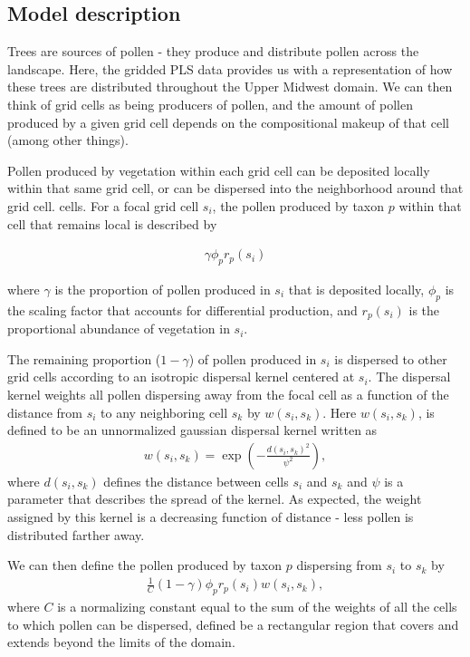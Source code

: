 \documentclass[12pt]{article}
\begin{document}
\subsection{Model description}

Trees are sources of pollen - they produce and distribute pollen
across the landscape. Here, the gridded PLS data provides us with a
representation of how these trees are distributed throughout the Upper
Midwest domain. We can then think of grid cells as being producers of
pollen, and the amount of pollen produced by a given grid cell
depends on the compositional makeup of that cell (among other things). 

Pollen produced by vegetation within each grid cell can be deposited
locally within that same grid cell, or can be dispersed into the neighborhood around that grid cell.
cells. For a focal grid cell $s_i$, the pollen produced by taxon
$p$ within that cell that remains local is described by

\begin{align}
\gamma \phi_p r_p(s_i)
\end{align} 

where $\gamma$ is the proportion of pollen produced in $s_i$ that is deposited locally,
$\phi_p$ is the scaling factor that accounts for differential
production, and $r_p(s_i)$ is the proportional abundance of vegetation
in $s_i$.

The remaining proportion ($1-\gamma$) of pollen produced in $s_i$ is
dispersed to other grid cells according to an isotropic dispersal
kernel centered at $s_i$. The dispersal kernel weights all pollen
dispersing away from the focal cell as a function of the distance from
$s_i$ to any neighboring cell $s_k$ by $w(s_i, s_k)$. Here $w(s_i,
s_k)$, is defined to be an unnormalized gaussian dispersal kernel written as
\begin{align}
w(s_i, s_k) = \exp\left( - \frac{d(s_i, s_k)^2}{\psi^2} \right),
\end{align}
where $d(s_i,s_k)$ defines the distance between cells $s_i$ and $s_k$
and $\psi$ is a parameter that describes the spread of the kernel. As
expected, the weight assigned by this kernel is a decreasing function
of distance - less pollen is distributed farther away.

 
We can then define the pollen produced by taxon $p$ dispersing from
$s_i$ to $s_k$ by
\begin{align}
\frac{1}{C} (1-\gamma) \phi_p r_p(s_i) w(s_i, s_k),
\end{align}
where $C$ is a normalizing constant equal to the sum of the weights of
all the cells to which pollen can be dispersed, defined be a
rectangular region that covers and extends beyond the limits of the domain.
\end{document}
